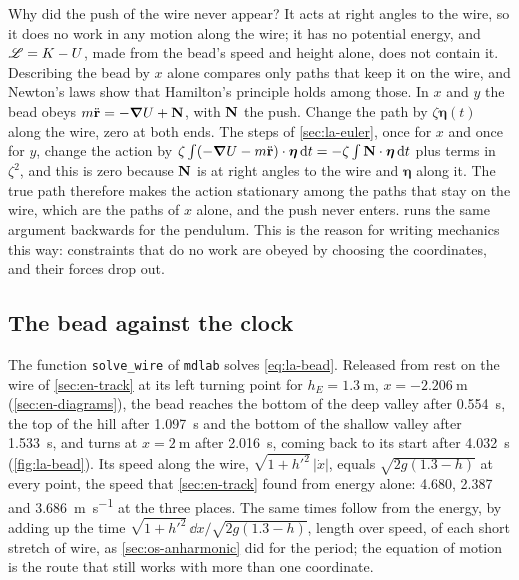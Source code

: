 Why did the push of the wire never appear? It acts at right angles to the
wire, so it does no work in any motion along the wire; it has no
potential energy, and $\mathscr{L} = K - U$, made from the bead's speed and
height alone, does not contain it. Describing the bead by $x$ alone compares only paths
that keep it on the wire, and Newton's laws show that Hamilton's principle
holds among those. In $x$ and $y$ the bead obeys $m\ddot{\bm{\mathrm{r}}} = -\bm{\nabla}
U + \bm{\mathrm{N}}$, with $\bm{\mathrm{N}}$ the push. Change the path by $\zeta
\boldsymbol\eta(t)$ along the wire, zero at both ends. The steps of
\cref{sec:la-euler}, once for $x$ and once for $y$, change the action by
$\zeta\int(-\bm{\nabla} U - m\ddot{\bm{\mathrm{r}}})\cdot\boldsymbol\eta\,\mathrm{d} t =
-\zeta\int\bm{\mathrm{N}}\cdot\boldsymbol\eta\,\mathrm{d} t$ plus terms in $\zeta^2$, and
this is zero because $\bm{\mathrm{N}}$ is at right angles to the wire and
$\boldsymbol\eta$ along it. The true path therefore makes the action
stationary among the paths that stay on the wire, which are the paths of
$x$ alone, and the push never enters.  runs the
same argument backwards for the pendulum. This is the reason
for writing mechanics this way: constraints that do no work are obeyed by
choosing the coordinates, and their forces drop out.

\subsection*{The bead against the clock}

The function \texttt{solve\_wire} of \texttt{mdlab} solves
\cref{eq:la-bead}. Released from rest on the wire of \cref{sec:en-track}
at its left turning point for $h_E = \SI{1.3}{\metre}$, $x =
\SI{-2.206}{\metre}$ (\cref{sec:en-diagrams}), the bead
reaches the bottom of the deep valley after \SI{0.554}{\second}, the top
of the hill after \SI{1.097}{\second} and the bottom of the shallow valley
after \SI{1.533}{\second}, and turns at $x = \SI{2}{\metre}$ after
\SI{2.016}{\second}, coming back to its start after \SI{4.032}{\second}
(\cref{fig:la-bead}). Its speed along the wire, $\sqrt{1 + h'^2}\,
\lvert\dot{x}\rvert$, equals $\sqrt{2g(1.3 - h)}$ at every point, the
speed that \cref{sec:en-track} found from energy alone: 4.680, 2.387 and
\SI{3.686}{\metre\per\second} at the three places. The same times follow
from the energy, by adding up the time $\sqrt{1 + h'^2}\,\dd x/\sqrt{2g(1.3
- h)}$, length over speed, of each short stretch of wire, as
\cref{sec:os-anharmonic} did for the period; the equation of motion is the
route that still works with more than one coordinate.

